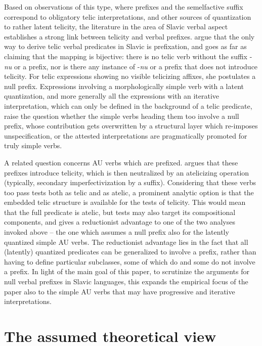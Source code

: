 \documentclass[output=paper]{langscibook}
\begin{document}
\noindent Based on observations of this type, where prefixes and the semelfactive suffix correspond to obligatory telic interpretations, and other sources of quantization to rather latent telicity, the literature in the area of Slavic verbal aspect establishes a strong link between telicity and verbal prefixes. \citet{Fleisch.2019} argue that the only way to derive telic verbal predicates in Slavic is prefixation, and \citet{Lazor.2010} goes as far as claiming that the mapping is bijective: there is no telic verb without the suffix -\textit{nu} or a prefix, nor is there any instance of -\textit{nu} or a prefix that does not introduce telicity. For telic expressions showing no visible telicizing affixes, she postulates a null prefix. Expressions involving a morphologically simple verb with a latent quantization, and more generally all the expressions with an iterative interpretation, which can only be defined in the background of a telic predicate, raise the question whether the simple verbs heading them too involve a null prefix, whose contribution gets overwritten by a structural layer which re-imposes unspecification, or the attested interpretations are pragmatically promoted for truly simple verbs.\largerpage[2]

A related question concerns AU verbs which are prefixed. \citet{Lazor.2010} argues that these prefixes introduce telicity, which is then neutralized by an atelicizing operation (typically, secondary imperfectivization by a suffix). Considering that these verbs too pass tests both as telic and as atelic, a prominent analytic option is that the embedded telic structure is available for the tests of telicity. This would mean that the full predicate is atelic, but tests may also target its compositional components, and gives a reductionist advantage to one of the two analyses invoked above -- the one which assumes a null prefix also for the latently quantized simple AU verbs. The reductionist advantage lies in the fact that all (latently) quantized predicates can be generalized to involve a prefix, rather  than having to define particular subclasses, some of which do and some do not involve a prefix. In light of the main goal of this paper, to scrutinize the arguments for null verbal prefixes in Slavic languages, this expands the empirical focus of the paper also to the simple AU verbs that may have progressive and iterative interpretations.

\section{The assumed theoretical view}\label{ars:sec:theoretical}
\end{document}

